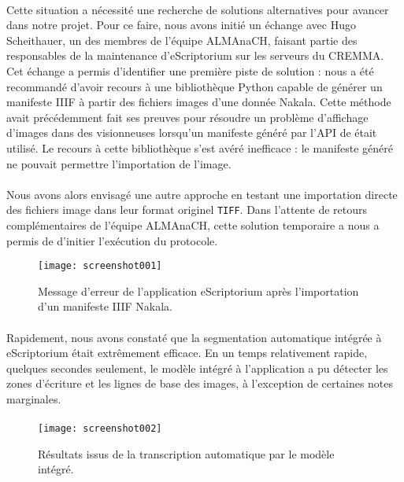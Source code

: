 \documentclass[a4paper,12pt,twoside]{book}
\begin{document}
\paragraph{}
Cette situation a nécessité une recherche de solutions alternatives pour avancer dans notre projet. Pour ce faire, nous avons initié un échange avec Hugo Scheithauer, un des membres de l’équipe ALMAnaCH, faisant partie des responsables de la maintenance d’eScriptorium sur les serveurs du CREMMA. Cet échange a permis d'identifier une première piste de solution : nous a été recommandé d’avoir recours à une bibliothèque Python capable de générer un manifeste IIIF à partir des fichiers images d’une donnée Nakala. Cette méthode avait précédemment fait ses preuves pour résoudre un problème d’affichage d’images dans des visionneuses lorsqu'un manifeste généré par l'API de  était utilisé. Le recours à cette bibliothèque s’est avéré inefficace : le manifeste généré ne pouvait permettre l’importation de l’image. 

\paragraph{}
Nous avons alors envisagé une autre approche en testant une importation directe des fichiers image dans leur format originel \texttt{TIFF}. Dans l’attente de retours complémentaires de l’équipe ALMAnaCH, cette solution temporaire a nous a permis de d’initier l’exécution du protocole. 

\begin{figure}[H]
	\centering
	\texttt{[image: screenshot001]}
	\caption{Message d'erreur de l'application eScriptorium après l'importation d'un manifeste IIIF Nakala.}
	\label{fig:screenshot001}
\end{figure}

\paragraph{}
Rapidement, nous avons constaté que la segmentation automatique intégrée à eScriptorium était extrêmement efficace. En un temps relativement rapide, quelques secondes seulement, le modèle intégré à l’application a pu détecter les zones d’écriture et les lignes de base des images, à l'exception de certaines notes marginales. 

\paragraph{}
\begin{figure}[H]
	\centering
	\texttt{[image: screenshot002]}
	\caption{Résultats issus de la transcription automatique par le modèle intégré.}
	\label{fig:screenshot002}
\end{figure}
\end{document}
